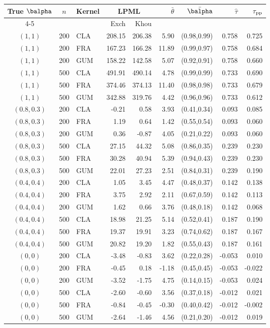 \begin{tabular}{cclrrrrrr}
\hline\hline
True $\balpha$ & $n$ & Kernel & \multicolumn{2}{c}{LPML} & $\bar\theta$ & $\bar\balpha$ & $\widehat\tau$ & $\tau_{\rm pp}$ \\
\cline{4-5}
 & & & Exch & Khou & & & & \\
\hline
$(1,1)$ & 200 & CLA & 208.15 & 206.38 & 5.90 & (0.98,0.99) & 0.758 & 0.725 \\
$(1,1)$ & 200 & FRA & 167.23 & 166.28 & 11.89 & (0.99,0.97) & 0.758 & 0.684 \\
$(1,1)$ & 200 & GUM & 158.22 & 142.58 & 5.07 & (0.92,0.91) & 0.758 & 0.660 \\
$(1,1)$ & 500 & CLA & 491.91 & 490.14 & 4.78 & (0.99,0.99) & 0.733 & 0.690 \\
$(1,1)$ & 500 & FRA & 374.46 & 374.13 & 11.40 & (0.98,0.98) & 0.733 & 0.679 \\
$(1,1)$ & 500 & GUM & 342.88 & 319.76 & 4.42 & (0.96,0.96) & 0.733 & 0.612 \\
$(0.8,0.3)$ & 200 & CLA & -0.21 & 0.58 & 3.93 & (0.41,0.34) & 0.093 & 0.085 \\
$(0.8,0.3)$ & 200 & FRA & 1.19 & 0.64 & 1.42 & (0.55,0.54) & 0.093 & 0.060 \\
$(0.8,0.3)$ & 200 & GUM & 0.36 & -0.87 & 4.05 & (0.21,0.22) & 0.093 & 0.060 \\
$(0.8,0.3)$ & 500 & CLA & 27.15 & 44.32 & 5.08 & (0.86,0.35) & 0.239 & 0.230 \\
$(0.8,0.3)$ & 500 & FRA & 30.28 & 40.94 & 5.39 & (0.94,0.43) & 0.239 & 0.230 \\
$(0.8,0.3)$ & 500 & GUM & 22.01 & 27.23 & 2.51 & (0.84,0.31) & 0.239 & 0.190 \\
$(0.4,0.4)$ & 200 & CLA & 1.05 & 3.45 & 4.47 & (0.48,0.37) & 0.142 & 0.138 \\
$(0.4,0.4)$ & 200 & FRA & 3.75 & 2.92 & 2.11 & (0.67,0.59) & 0.142 & 0.113 \\
$(0.4,0.4)$ & 200 & GUM & 1.62 & 0.66 & 3.76 & (0.48,0.18) & 0.142 & 0.068 \\
$(0.4,0.4)$ & 500 & CLA & 18.98 & 21.25 & 5.14 & (0.52,0.41) & 0.187 & 0.190 \\
$(0.4,0.4)$ & 500 & FRA & 19.37 & 19.91 & 3.23 & (0.74,0.62) & 0.187 & 0.167 \\
$(0.4,0.4)$ & 500 & GUM & 20.82 & 19.20 & 1.82 & (0.55,0.43) & 0.187 & 0.161 \\
$(0,0)$ & 200 & CLA & -3.48 & -0.83 & 3.62 & (0.22,0.28) & -0.053 & 0.010 \\
$(0,0)$ & 200 & FRA & -0.45 & 0.18 & -1.18 & (0.45,0.45) & -0.053 & -0.022 \\
$(0,0)$ & 200 & GUM & -3.52 & -1.75 & 4.75 & (0.14,0.15) & -0.053 & 0.024 \\
$(0,0)$ & 500 & CLA & -2.60 & -0.60 & 3.56 & (0.37,0.18) & -0.012 & 0.021 \\
$(0,0)$ & 500 & FRA & -0.84 & -0.45 & -0.30 & (0.40,0.42) & -0.012 & -0.002 \\
$(0,0)$ & 500 & GUM & -2.64 & -1.46 & 4.56 & (0.21,0.20) & -0.012 & 0.019 \\
\hline\hline
\end{tabular}
